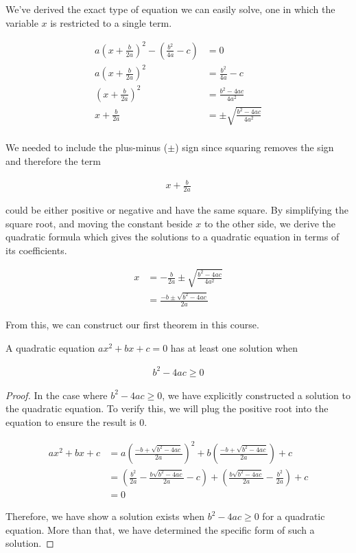 We've derived the exact type of equation we can easily solve, one in which the variable $x$ is restricted to a single term.

\begin{align*}
	a \left( x + \frac{b}{2a} \right)^2 - \left( \frac{b^2}{4a} -c \right) &= 0 \\
	a \left( x + \frac{b}{2a} \right)^2 &= \frac{b^2}{4a} - c \\
	\left( x + \frac{b}{2a} \right)^2 &= \frac{b^2 - 4ac}{4a^2} \\
	x + \frac{b}{2a} &= \pm \sqrt{\frac{b^2 - 4ac}{4a^2}} \\
\end{align*}

We needed to include the plus-minus ($\pm$) sign since squaring removes the sign and therefore the term

\begin{align*}
	x + \frac{b}{2a}
\end{align*}

could be either positive or negative and have the same square. By simplifying the square root, and moving the constant beside $x$ to the other side, we derive the quadratic formula which gives the solutions to a quadratic equation in terms of its coefficients.

\begin{align}
	x &= - \frac{b}{2a} \pm \sqrt{\frac{b^2 - 4ac}{4a^2}} \\ 
	&= \frac{-b \pm \sqrt{b^2 - 4ac}}{2a}
\end{align}

From this, we can construct our first theorem in this course.

\vspace{\baselineskip}
\begin{theorem}
	A quadratic equation $ax^2 + bx + c = 0$ has at least one solution when
	
	\begin{align}
		b^2 - 4ac \ge 0
	\end{align}
\end{theorem}

\begin{proof}
	In the case where $b^2 - 4ac \ge 0$, we have explicitly constructed a solution to the quadratic equation. To verify this, we will plug the positive root into the equation to ensure the result is 0.
	
	\begin{align*}
		ax^2 + bx + c
		&= a \left( \frac{-b + \sqrt{b^2 - 4ac}}{2a} \right)^2 + b \left( \frac{-b + \sqrt{b^2 - 4ac}}{2a} \right) + c \\
		&= \left( \frac{b^2}{2a} - \frac{b\sqrt{b^2 - 4ac}}{2a} - c\right) + \left( \frac{b\sqrt{b^2 - 4ac}}{2a} - \frac{b^2}{2a}\right) + c \\
		&= 0
	\end{align*}
	
	Therefore, we have show a solution exists when  $b^2 - 4ac \ge 0$ for a quadratic equation. More than that, we have determined the specific form of such a solution.
\end{proof}
\vspace{\baselineskip}

